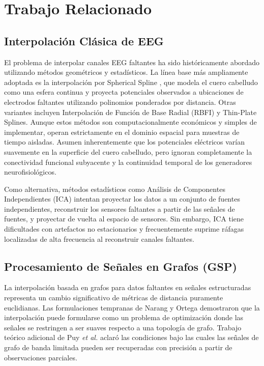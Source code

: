 \section{Trabajo Relacionado}

\subsection{Interpolación Clásica de EEG}
El problema de interpolar canales EEG faltantes ha sido históricamente abordado utilizando métodos geométricos y estadísticos. La línea base más ampliamente adoptada es la interpolación por Spherical Spline \cite{perrin1989}, que modela el cuero cabelludo como una esfera continua y proyecta potenciales observados a ubicaciones de electrodos faltantes utilizando polinomios ponderados por distancia. Otras variantes incluyen Interpolación de Función de Base Radial (RBFI) \cite{jager2016} y Thin-Plate Splines. Aunque estos métodos son computacionalmente económicos y simples de implementar, operan estrictamente en el dominio espacial para muestras de tiempo aisladas. Asumen inherentemente que los potenciales eléctricos varían suavemente en la superficie del cuero cabelludo, pero ignoran completamente la conectividad funcional subyacente y la continuidad temporal de los generadores neurofisiológicos.

Como alternativa, métodos estadísticos como Análisis de Componentes Independientes (ICA) intentan proyectar los datos a un conjunto de fuentes independientes, reconstruir los sensores faltantes a partir de las señales de fuentes, y proyectar de vuelta al espacio de sensores. Sin embargo, ICA tiene dificultades con artefactos no estacionarios y frecuentemente suprime ráfagas localizadas de alta frecuencia al reconstruir canales faltantes.

\subsection{Procesamiento de Señales en Grafos (GSP)}
La interpolación basada en grafos para datos faltantes en señales estructuradas representa un cambio significativo de métricas de distancia puramente euclidianas. Las formulaciones tempranas de Narang y Ortega \cite{narang2013} demostraron que la interpolación puede formularse como un problema de optimización donde las señales se restringen a ser suaves respecto a una topología de grafo. Trabajo teórico adicional de Puy \emph{et al.} \cite{puy2018} aclaró las condiciones bajo las cuales las señales de grafo de banda limitada pueden ser recuperadas con precisión a partir de observaciones parciales.

